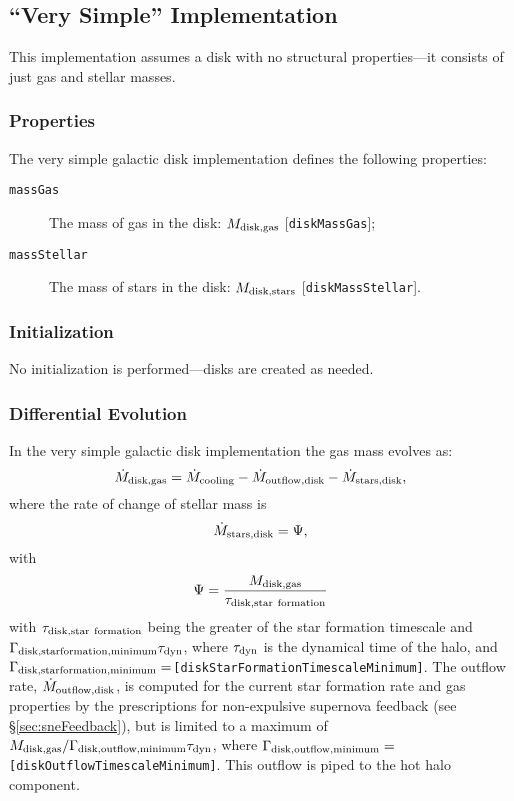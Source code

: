 \subsection{``Very Simple'' Implementation}

This implementation assumes a disk with no structural properties---it consists of just gas and stellar masses.

\subsubsection{Properties}

The very simple galactic disk implementation defines the following properties:
\begin{description}
 \item [{\tt massGas}] The mass of gas in the disk: $M_{\rm disk, gas}$ [{\tt diskMassGas}];
 \item [{\tt massStellar}] The mass of stars in the disk: $M_{\rm disk, stars}$ [{\tt diskMassStellar}].
\end{description}

\subsubsection{Initialization}

No initialization is performed---disks are created as needed.

\subsubsection{Differential Evolution}

In the very simple galactic disk implementation the gas mass evolves as:
\begin{equation}
 \dot{M}_{\rm disk, gas} = \dot{M}_{\rm cooling} - \dot{M}_{\rm outflow, disk} - \dot{M}_{\rm stars, disk},
\end{equation}
where the rate of change of stellar mass is
\begin{equation}
 \dot{M}_{\rm stars, disk} = \Psi,
\end{equation}
with
\begin{equation}
 \Psi = {M_{\rm disk, gas} \over \tau_{\rm disk, star~formation}}
\end{equation}
with $\tau_{\rm disk, star~formation}$ being the greater of the star formation timescale and $\Gamma_{\rm disk, star formation, minimum} \tau_{\rm dyn}$, where $\tau_{\rm dyn}$ is the dynamical time of the halo, and $\Gamma_{\rm disk, star formation, minimum}=${\tt [diskStarFormationTimescaleMinimum]}. The outflow rate, $\dot{M}_{\rm outflow, disk}$, is computed for the current star formation rate and gas properties by the prescriptions for non-expulsive supernova feedback (see \S\ref{sec:sneFeedback}), but is limited to a maximum of $M_{\rm disk, gas}/ \Gamma_{\rm disk, outflow, minimum} \tau_{\rm dyn}$, where $\Gamma_{\rm disk, outflow, minimum}=${\tt [diskOutflowTimescaleMinimum]}. This outflow is piped to the hot halo component.


